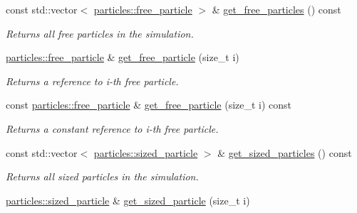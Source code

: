 \begin{DoxyCompactItemize}
const std\+::vector$<$ \hyperlink{classphysim_1_1particles_1_1free__particle}{particles\+::free\+\_\+particle} $>$ \& \hyperlink{classphysim_1_1simulator_a8d030b30ee12814ea6a20faa7e61bd8c}{get\+\_\+free\+\_\+particles} () const
\begin{DoxyCompactList}\small\item\em Returns all free particles in the simulation. \end{DoxyCompactList}\item 
\mbox{\label{classphysim_1_1simulator_a4e357245a3b138c46c8b52647b65cfa0}} 
\hyperlink{classphysim_1_1particles_1_1free__particle}{particles\+::free\+\_\+particle} \& \hyperlink{classphysim_1_1simulator_a4e357245a3b138c46c8b52647b65cfa0}{get\+\_\+free\+\_\+particle} (size\+\_\+t i)
\begin{DoxyCompactList}\small\item\em Returns a reference to i-\/th free particle. \end{DoxyCompactList}\item 
\mbox{\label{classphysim_1_1simulator_ae2db5d5199ffa176bc5e08fee2d41a31}} 
const \hyperlink{classphysim_1_1particles_1_1free__particle}{particles\+::free\+\_\+particle} \& \hyperlink{classphysim_1_1simulator_ae2db5d5199ffa176bc5e08fee2d41a31}{get\+\_\+free\+\_\+particle} (size\+\_\+t i) const
\begin{DoxyCompactList}\small\item\em Returns a constant reference to i-\/th free particle. \end{DoxyCompactList}\item 
const std\+::vector$<$ \hyperlink{classphysim_1_1particles_1_1sized__particle}{particles\+::sized\+\_\+particle} $>$ \& \hyperlink{classphysim_1_1simulator_acf45d34a15b06437858e3324af1a559c}{get\+\_\+sized\+\_\+particles} () const
\begin{DoxyCompactList}\small\item\em Returns all sized particles in the simulation. \end{DoxyCompactList}\item 
\mbox{\label{classphysim_1_1simulator_a5fd37f79deceb3be5b4d70c9b421a637}} 
\hyperlink{classphysim_1_1particles_1_1sized__particle}{particles\+::sized\+\_\+particle} \& \hyperlink{classphysim_1_1simulator_a5fd37f79deceb3be5b4d70c9b421a637}{get\+\_\+sized\+\_\+particle} (size\+\_\+t i)

\end{DoxyCompactItemize}
